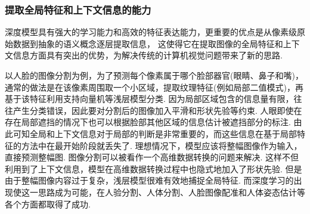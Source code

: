 \subsubsection{提取全局特征和上下文信息的能力}
深度模型具有强大的学习能力和高效的特征表达能力，更重要的优点是从像素级原始数据到抽象的语义概念逐层提取信息，
这使得它在提取图像的全局特征和上下文信息方面具有突出的优势，为解决传统的计算机视觉问题带来了新的思路.

\begin{example}
以人脸的图像分割为例，为了预测每个像素属于哪个脸部器官(眼睛、鼻子和嘴)，
通常的做法是在该像素周围取一个小区域，提取纹理特征(例如局部二值模式)，再基于该特征利用支持向量机等浅层模型分类.
因为局部区域包含的信息量有限，往往产生分类错误，因此要对分割后的图像加入平滑和形状先验等约束.
人眼即使在存在局部遮挡的情况下也可以根据脸部其他区域的信息估计被遮挡部分的标注. 由此可知全局和上下文信息对于局部的判断是非常重要的，而这些信息在基于局部特征的方法中在最开始阶段就丢失了.
理想情况下，模型应该将整幅图像作为输入，直接预测整幅图. 图像分割可以被看作一个高维数据转换的问题来解决.
这样不但利用到了上下文信息，模型在高维数据转换过程中也隐式地加入了形状先验.
但是由于整幅图像内容过于复杂，浅层模型很难有效地捕捉全局特征.
而深度学习的出现使这一思路成为可能，在人验分割、人体分割、人脸图像配准和人体姿态估计等各个方面都取得了成功.
\end{example}
